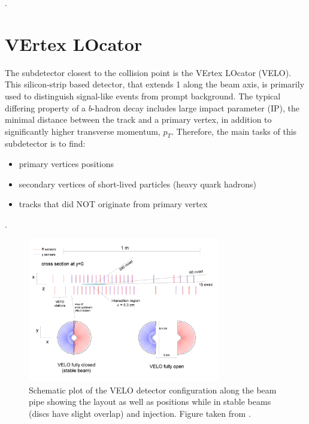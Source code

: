  \color{black}.

\section{VErtex LOcator }
\label{velosys}
The subdetector closest to the collision point is the VErtex LOcator (\Gls{VELO}). This silicon-strip based detector, that extends 1 \m along the beam axis, is primarily used to distinguish signal-like events from prompt background. The typical differing property of a $b$-hadron decay includes large impact parameter (\Gls{IP}), the minimal distance between the track and a  primary vertex, in addition to significantly higher transverse momentum, $p_{T}$. Therefore, the main tasks of this subdetector is to find: 
\begin{itemize}
\item primary vertices positions
\item secondary vertices of short-lived particles (heavy quark hadrons)
\item tracks that did NOT originate from primary vertex
\end{itemize}.


\begin{figure}[!h]
	\centering
	\includegraphics[width = 0.75\textwidth]{figs/detector/veloOverview.png}
	\caption{Schematic plot of the \Gls{VELO} detector configuration along the beam pipe showing the layout as well as positions while in stable beams (discs have slight overlap) and injection. Figure taken from \cite{det_paper}.}
	\label{fig:veloover}
\end{figure}

